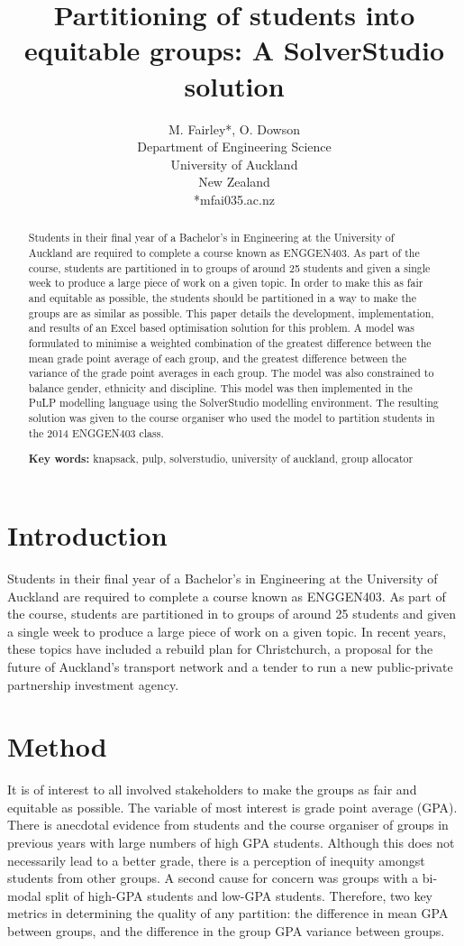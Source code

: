 \documentclass[12pt]{ORSNZ}
\title{Partitioning of students into equitable groups: A SolverStudio solution}
\author{M. Fairley*, O. Dowson\\Department of Engineering Science\\University of
  Auckland\\New Zealand\\{*}mfai035\@@aucklanduni.ac.nz}
\date{} %
\begin{document}
\maketitle
\pagestyle{empty} \thispagestyle{empty}
\begin{abstract}
Students in their final year of a Bachelor’s in Engineering at the University of Auckland are required to complete a course known as ENGGEN403. As part of the course, students are partitioned in to groups of around 25 students and given a single week to produce a large piece of work on a given topic. In order to make this as fair and equitable as possible, the students should be partitioned in a way to make the groups are as similar as possible. This paper details the development, implementation, and results of an Excel based optimisation solution for this problem. A model was formulated to minimise a weighted combination of the greatest difference between the mean grade point average of each group, and the greatest difference between the variance of the grade point averages in each group. The model was also constrained to balance gender, ethnicity and discipline. This model was then implemented in the PuLP modelling language using the SolverStudio modelling environment. The resulting solution was given to the course organiser who used the model to partition students in the 2014 ENGGEN403 class.

\textbf{Key words:} knapsack, pulp, solverstudio, university of auckland, group allocator
\end{abstract}

\section{Introduction}
Students in their final year of a Bachelor’s in Engineering at the University of Auckland are required to complete a course known as ENGGEN403. As part of the course, students are partitioned in to groups of around 25 students and given a single week to produce a large piece of work on a given topic. In recent years, these topics have included a rebuild plan for Christchurch, a proposal for the future of Auckland’s transport network and a tender to run a new public-private partnership investment agency.

\section{Method}
It is of interest to all involved stakeholders to make the groups as fair and equitable as possible. The variable of most interest is grade point average (GPA). There is anecdotal evidence from students and the course organiser of groups in previous years with large numbers of high GPA students. Although this does not necessarily lead to a better grade, there is a perception of inequity amongst students from other groups. A second cause for concern was groups with a bi-modal split of high-GPA students and low-GPA students. Therefore, two key metrics in determining the quality of any partition: the difference in mean GPA between groups, and the difference in the group GPA variance between groups.
\end{document}
